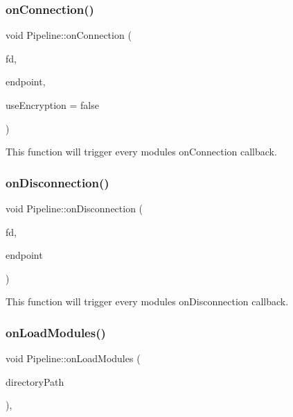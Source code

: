 \subsubsection{\texorpdfstring{onConnection()}{onConnection()}}
{\footnotesize\ttfamily void Pipeline\+::on\+Connection (\begin{DoxyParamCaption}\item[{const File\+Descriptor}]{fd,  }\item[{const \mbox{\hyperlink{classo_z_1_1_endpoint}{Endpoint}}}]{endpoint,  }\item[{const bool}]{use\+Encryption = {\ttfamily false} }\end{DoxyParamCaption})\hspace{0.3cm}{\ttfamily [virtual]}}



This function will trigger every module\textquotesingle{}s \textquotesingle{}on\+Connection\textquotesingle{} callback. 

\mbox{\label{classo_z_1_1_pipeline_afd035df19d82c10b55af51e727e08407}} 
\subsubsection{\texorpdfstring{onDisconnection()}{onDisconnection()}}
{\footnotesize\ttfamily void Pipeline\+::on\+Disconnection (\begin{DoxyParamCaption}\item[{const File\+Descriptor}]{fd,  }\item[{const \mbox{\hyperlink{classo_z_1_1_endpoint}{Endpoint}}}]{endpoint }\end{DoxyParamCaption})\hspace{0.3cm}{\ttfamily [virtual]}}



This function will trigger every module\textquotesingle{}s \textquotesingle{}on\+Disconnection\textquotesingle{} callback. 

\mbox{\label{classo_z_1_1_pipeline_a0265d90a5540e69b25069d5d96973c53}} 
\subsubsection{\texorpdfstring{onLoadModules()}{onLoadModules()}}
{\footnotesize\ttfamily void Pipeline\+::on\+Load\+Modules (\begin{DoxyParamCaption}\item[{const std\+::string \&}]{directory\+Path }\end{DoxyParamCaption})\hspace{0.3cm}{\ttfamily [protected]}, {\ttfamily [virtual]}}



